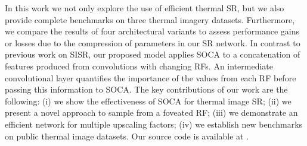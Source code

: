 \documentclass[runningheads]{llncs}
\begin{document}



In this work we not only explore the use of efficient thermal SR, but we also
provide complete benchmarks on three thermal imagery datasets. Furthermore, we
compare the results of four architectural variants to assess performance gains
or losses due to the compression of parameters in our SR network. In contrast
to previous work on SISR, our proposed model applies SOCA to a concatenation of
features produced from convolutions with changing RFs. An intermediate
convolutional layer quantifies the importance of the values from each RF before
passing this information to SOCA. The key contributions of our work are the
following: (i) we show the effectiveness of SOCA for thermal image SR; (ii) we
present a novel approach to sample from a foveated RF; (iii) we demonstrate an
efficient network for multiple upscaling factors; (iv) we establish new
benchmarks on public thermal image datasets. Our source code is available at
\cite{attention_with_varying_receptive_fields_network}.
\end{document}
